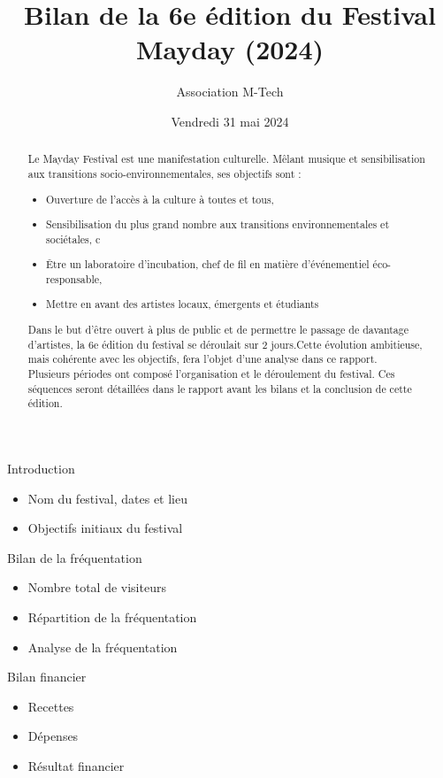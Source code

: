\documentclass[12pt,a4paper,draft]{report}
\title{Bilan de la 6e édition du Festival Mayday (2024)}
\author{Association M-Tech}
\date{Vendredi 31 mai 2024}
\begin{document}
\maketitle

\begin{abstract}
Le Mayday Festival est une manifestation culturelle. Mêlant musique et sensibilisation aux transitions socio-environnementales, ses objectifs sont :
\begin{itemize}
\item Ouverture de l'accès à la culture à toutes et tous,
\item Sensibilisation du plus grand nombre aux transitions environnementales et sociétales,
c\item Être un laboratoire d'incubation, chef de fil en matière d'événementiel éco-responsable,
\item Mettre en avant des artistes locaux, émergents et étudiants
\end{itemize}
Dans le but d'être ouvert à plus de public et de permettre le passage de davantage d'artistes, la 6e édition du festival se déroulait sur 2 jours.Cette évolution ambitieuse, mais cohérente avec les objectifs, fera l'objet d'une analyse dans ce rapport. \\
Plusieurs périodes ont composé l'organisation et le déroulement du festival. Ces séquences seront détaillées dans le rapport avant les bilans et la conclusion de cette édition.
\end{abstract}

\tableofcontents

\newpage

Introduction
\begin{itemize}
\item Nom du festival, dates et lieu
\item Objectifs initiaux du festival
\end{itemize}

Bilan de la fréquentation
\begin{itemize}
\item Nombre total de visiteurs
\item Répartition de la fréquentation
\item Analyse de la fréquentation
\end{itemize}

Bilan financier
\begin{itemize}
\item Recettes
\item Dépenses
\item Résultat financier
\end{itemize}
\end{document}
